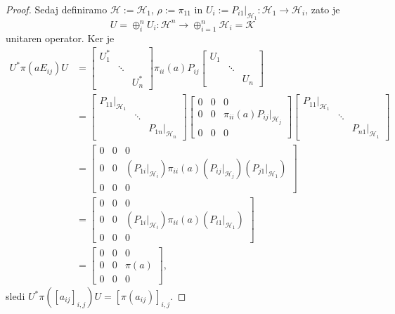 \begin{proof}
    Sedaj definiramo $\mathcal{H} := \mathcal{H}_1$, $\rho := \pi_{11}$ in $U_i := P_{i1} \big|_{\mathcal{H}_1} : \mathcal{H}_1 \to\mathcal{H}_i$, zato je 
    $$U = \oplus_i ^n U_i : \mathcal{H}^n \to \oplus_{i = 1} ^n \mathcal{H}_i = \mathcal{K}$$
    unitaren operator. Ker je
    \begin{align*}
        U^* \pi(a E_{ij}) U &= \begin{bmatrix}
            U_1 ^* & & \\
            & \ddots & \\
            & & U_n ^* 
        \end{bmatrix} \pi_{ii} (a) P_{ij} \begin{bmatrix}
            U_1  & & \\
            & \ddots & \\
            & & U_n  
        \end{bmatrix}\\
        &= \begin{bmatrix}
            P_{11}\big|_{\mathcal{H}_1}  & & \\
            & \ddots & \\
            & & P_{1n} \big|_{\mathcal{H}_n} 
        \end{bmatrix} \begin{bmatrix}
           0 & 0 & 0 \\
           0  & 0 & \pi_{ii} (a) {P_{ij}\big|_{\mathcal{H}_j}} \\
            0 & 0 & 0 
        \end{bmatrix}
        \begin{bmatrix}
            P_{11}\big|_{\mathcal{H}_1}  & & \\
            & \ddots & \\
            & & P_{n1} \big|_{\mathcal{H}_1} 
        \end{bmatrix}\\
        &= \begin{bmatrix}
            0 & 0 & 0 \\
            0  & 0 & (P_{1i} \big|_{\mathcal{H}_i}) \pi_{ii} (a){(P_{ij}\big|_{\mathcal{H}_j})}(P_{j1} \big|_{\mathcal{H}_1}) \\
             0 & 0 & 0 
         \end{bmatrix}\\
         &= \begin{bmatrix}
            0 & 0 & 0 \\
            0  & 0 & (P_{1i} \big|_{\mathcal{H}_i}) \pi_{ii} (a)(P_{i1} \big|_{\mathcal{H}_1}) \\
             0 & 0 & 0 
         \end{bmatrix}\\
         &= \begin{bmatrix}
            0 & 0 & 0 \\
            0  & 0 & \pi(a)  \\
             0 & 0 & 0 
         \end{bmatrix},
    \end{align*}
    sledi $U^* \pi([a_{ij}]_{i, j}) U = [\pi(a_{ij})]_{i, j}$.
\end{proof}

